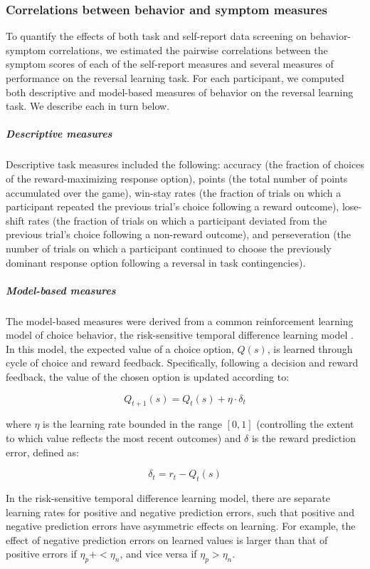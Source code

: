 \documentclass[a4paper,notitlepage,12pt]{article}
\begin{document}
\subsubsection{Correlations between behavior and symptom measures}

To quantify the effects of both task and self-report data screening on behavior-symptom correlations, we estimated the pairwise correlations between the symptom scores of each of the self-report measures and several measures of performance on the reversal learning task. For each participant, we computed both descriptive and model-based measures of behavior on the reversal learning task. We describe each in turn below.

\subparagraph{Descriptive measures} Descriptive task measures included the following: accuracy (the fraction of choices of the reward-maximizing response option), points (the total number of points accumulated over the game), win-stay rates (the fraction of trials on which a participant repeated the previous trial's choice following a reward outcome), lose-shift rates (the fraction of trials on which a participant deviated from the previous trial's choice following a non-reward outcome), and perseveration (the number of trials on which a participant continued to choose the previously dominant response option following a reversal in task contingencies).

\subparagraph{Model-based measures} The model-based measures were derived from a common reinforcement learning model of choice behavior, the risk-sensitive temporal difference learning model \cite{niv2012neural}. In this model, the expected value of a choice option, $Q(s)$, is learned through cycle of choice and reward feedback. Specifically, following a decision and reward feedback, the value of the chosen option is updated according to:

\begin{equation*}
    Q_{t+1}(s) = Q_{t}(s) + \eta \cdot \delta_{t}
\end{equation*}

where $\eta$ is the learning rate bounded in the range $[0,1]$ (controlling the extent to which value reflects the most recent outcomes) and $\delta$ is the reward prediction error, defined as:

\begin{equation*}
    \delta_t = r_t - Q_{t}(s)
\end{equation*}

In the risk-sensitive temporal difference learning model, there are separate learning rates for positive and negative prediction errors, such that positive and negative prediction errors have asymmetric effects on learning. For example, the effect of negative prediction errors on learned values is larger than that of positive errors if $\eta_p+ < \eta_n$, and vice versa if $\eta_p > \eta_n$.
\end{document}
